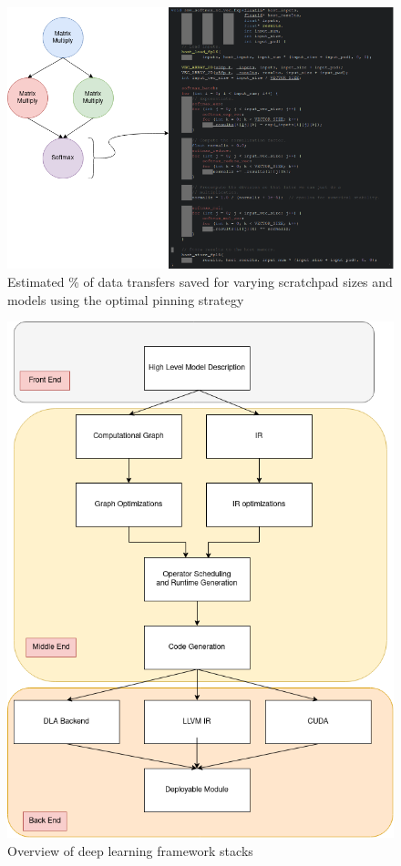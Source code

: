 \begin{figure}[th]
\centering
\includegraphics[scale=0.5]{Figures/operator_to_kernel.png}
\decoRule
\caption[operatorKernel]{Estimated \% of data transfers saved for varying scratchpad sizes and models using the optimal pinning strategy}
\label{fig:OperatorKernel}
\end{figure}

\begin{figure}[th]
\centering
\includegraphics[scale=0.5]{Figures/framework_stack.png}
\decoRule
\caption[dlFramework]{Overview of deep learning framework stacks}
\label{fig:dlFramework}
\end{figure}


